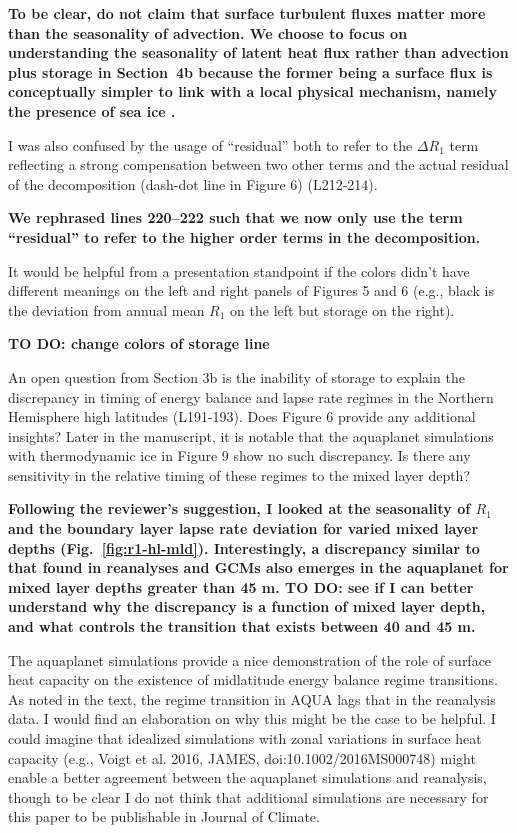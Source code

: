 \documentclass{article}
\begin{document}
\textbf{To be clear, do not claim that surface turbulent fluxes matter more than the seasonality of advection. We choose to focus on understanding the seasonality of latent heat flux rather than advection plus storage in Section~4b because the former being a surface flux is conceptually simpler to link with a local physical mechanism, namely the presence of sea ice \citep[e.g.,][]{serreze2006, boeke2018, feldl2020}.} 

I was also confused by the usage of ``residual'' both to refer to the $\Delta R_1$ term reflecting a strong compensation between two other terms and the actual residual of the decomposition (dash-dot line in Figure 6) (L212-214).

\textbf{We rephrased lines 220--222 such that we now only use the term ``residual'' to refer to the higher order terms in the decomposition.}

It would be helpful from a presentation standpoint if the colors didn't have different meanings on the left and right panels of Figures 5 and 6 (e.g., black is the deviation from annual mean $R_1$ on the left but storage on the right).

{\color{red}\textbf{TO DO: change colors of storage line}}

An open question from Section 3b is the inability of storage to explain the discrepancy in timing of energy balance and lapse rate regimes in the Northern Hemisphere high latitudes (L191-193). Does Figure 6 provide any additional insights? Later in the manuscript, it is notable that the aquaplanet simulations with thermodynamic ice in Figure 9 show no such discrepancy. Is there any sensitivity in the relative timing of these regimes to the mixed layer depth?

{\color{red}\textbf{Following the reviewer's suggestion, I looked at the seasonality of $R_1$ and the boundary layer lapse rate deviation for varied mixed layer depths (Fig.~\ref{fig:r1-hl-mld}). Interestingly, a discrepancy similar to that found in reanalyses and GCMs also emerges in the aquaplanet for mixed layer depths greater than 45 m. TO DO: see if I can better understand why the discrepancy is a function of mixed layer depth, and what controls the transition that exists between 40 and 45 m.}}

The aquaplanet simulations provide a nice demonstration of the role of surface heat capacity on the existence of midlatitude energy balance regime transitions. As noted in the text, the regime transition in AQUA lags that in the reanalysis data. I would find an elaboration on why this might be the case to be helpful. I could imagine that idealized simulations with zonal variations in surface heat capacity (e.g., Voigt et al. 2016, JAMES, doi:10.1002/2016MS000748) might enable a better agreement between the aquaplanet simulations and reanalysis, though to be clear I do not think that additional simulations are necessary for this paper to be publishable in Journal of Climate.
\end{document}
